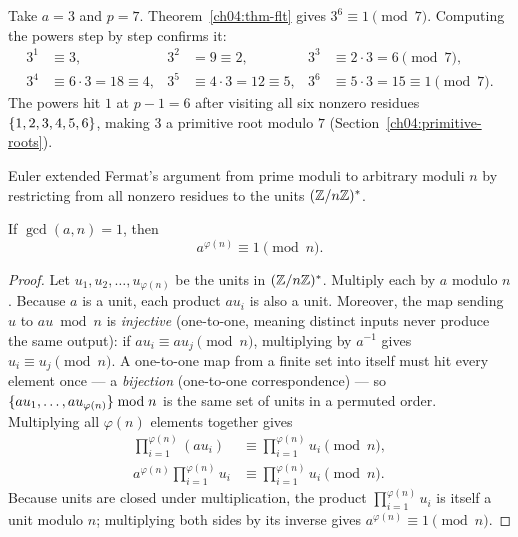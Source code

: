 \begin{example}[Fermat at $p = 7$]
\label{ch04:ex-flt-7}
Take $a = 3$ and $p = 7$. Theorem~\ref{ch04:thm-flt} gives $3^6 \equiv 1 \pmod 7$. Computing the
powers step by step confirms it:
\begin{align*}
  3^1 &\equiv 3, & 3^2 &= 9 \equiv 2, & 3^3 &\equiv 2 \cdot 3 = 6 \pmod 7, \\
  3^4 &\equiv 6 \cdot 3 = 18 \equiv 4, & 3^5 &\equiv 4 \cdot 3 = 12 \equiv 5, & 3^6 &\equiv 5 \cdot 3 = 15 \equiv 1 \pmod 7.
\end{align*}
The powers hit $1$ at $p - 1 = 6$ after visiting all six nonzero residues $\{1,2,3,4,5,6\}$, making
$3$ a primitive root modulo $7$ (Section~\ref{ch04:primitive-roots}).
\end{example}

Euler extended Fermat's argument from prime moduli to arbitrary moduli $n$ by restricting from all
nonzero residues to the units $(\mathbb{Z}/n\mathbb{Z})^{*}$.

\begin{theorem}
\label{ch04:thm-euler}
If $\gcd(a, n) = 1$, then
\[
  a^{\varphi(n)} \equiv 1 \pmod n.
\]
\end{theorem}

\begin{proof}
Let $u_1, u_2, \dots, u_{\varphi(n)}$ be the units in $(\mathbb{Z}/n\mathbb{Z})^{*}$. Multiply each by $a$ modulo $n$.
Because $a$ is a unit, each product $a u_i$ is also a unit. Moreover, the map sending $u$ to
$au \bmod n$ is \emph{injective} (one-to-one, meaning distinct inputs never produce the same
output): if $au_i \equiv au_j \pmod n$, multiplying by $a^{-1}$ gives $u_i \equiv u_j \pmod n$. A
one-to-one map from a finite set into itself must hit every element once --- a \emph{bijection}
(one-to-one correspondence) --- so $\{au_1, \dots, au_{\varphi(n)}\} \bmod n$ is the same set of
units in a permuted order. Multiplying all $\varphi(n)$ elements together gives
\begin{align*}
  \prod_{i=1}^{\varphi(n)} (a u_i) &\equiv \prod_{i=1}^{\varphi(n)} u_i \pmod n, \\
  a^{\varphi(n)} \prod_{i=1}^{\varphi(n)} u_i &\equiv \prod_{i=1}^{\varphi(n)} u_i \pmod n.
\end{align*}
Because units are closed under multiplication, the product $\prod_{i=1}^{\varphi(n)} u_i$ is itself
a unit modulo $n$; multiplying both sides by its inverse gives $a^{\varphi(n)} \equiv 1 \pmod n$.
\end{proof}


